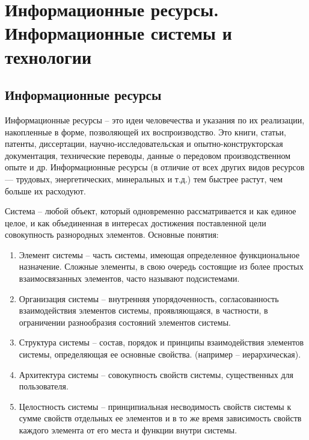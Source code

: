 \documentclass[a4paper]{article}
\begin{document}
\section{Информационные ресурсы. Информационные системы и технологии}

\subsection{Информационные ресурсы}

Информационные ресурсы – это идеи человечества и указания по их реализации, накопленные в форме, позволяющей их воспроизводство. Это книги, статьи, патенты, диссертации, научно-исследовательская и опытно-конструкторская документация, технические переводы, данные о передовом производственном опыте и др. Информационные ресурсы (в отличие от всех других видов ресурсов — трудовых, энергетических, минеральных и т.д.) тем быстрее растут, чем больше их расходуют.

Система – любой объект, который одновременно рассматривается и как единое целое, и как объединенная в интересах достижения поставленной цели совокупность разнородных элементов.
Основные понятия:
\begin{enumerate}
\item Элемент системы – часть системы, имеющая определенное функциональное назначение. Сложные элементы, в свою очередь состоящие из более простых взаимосвязанных элементов, часто называют подсистемами.
\item  Организация системы – внутренняя упорядоченность, согласованность взаимодействия элементов системы, проявляющаяся, в частности, в ограничении разнообразия состояний элементов системы.
\item Структура системы – состав, порядок и принципы взаимодействия элементов системы, определяющая ее основные свойства. (например – иерархическая).
\item Архитектура системы – совокупность свойств системы, существенных для пользователя.
\item Целостность системы – принципиальная несводимость свойств системы к сумме свойств отдельных ее элементов и в то же время зависимость свойств каждого элемента от его места и функции внутри системы.
\end{enumerate}
\end{document}
